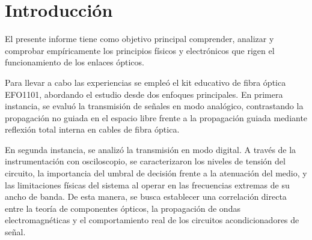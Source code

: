 \documentclass[12pt]{article}
\begin{document}
\tableofcontents
\newpage
\listoffigures
\newpage

\section{Introducción}

El presente informe tiene como objetivo principal comprender, analizar y comprobar empíricamente los principios físicos y electrónicos que rigen el funcionamiento de los enlaces ópticos.

Para llevar a cabo las experiencias se empleó el kit educativo de fibra óptica EFO1101, abordando el estudio desde dos enfoques principales. En primera instancia, se evaluó la transmisión de señales en modo analógico, contrastando la propagación no guiada en el espacio libre frente a la propagación guiada mediante reflexión total interna en cables de fibra óptica. 

En segunda instancia, se analizó la transmisión en modo digital. A través de la instrumentación con osciloscopio, se caracterizaron los niveles de tensión del circuito, la importancia del umbral de decisión frente a la atenuación del medio, y las limitaciones físicas del sistema al operar en las frecuencias extremas de su ancho de banda. De esta manera, se busca establecer una correlación directa entre la teoría de componentes ópticos, la propagación de ondas electromagnéticas y el comportamiento real de los circuitos acondicionadores de señal.



\newpage


\newpage


\newpage


\newpage


\newpage

\nocite{*}

\newpage
\printbibliography[heading=bibintoc, title={Bibliografía y Referencias}]
\end{document}
